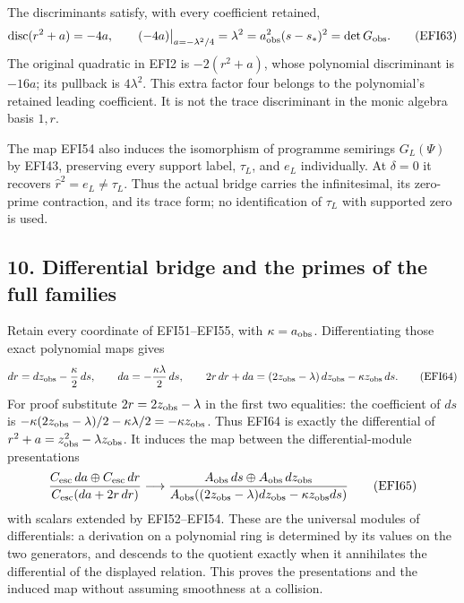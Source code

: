\documentclass[
  10pt,
  a4paper,
]{article}
\begin{document}
The discriminants satisfy, with every coefficient retained, \[
\operatorname{disc}(r^2+a)=-4a,\qquad
(-4a)\big|_{a=-\lambda^2/4}=\lambda^2
=a_{\rm obs}^2(s-s_*)^2
=\det G_{\rm obs}.
\tag{EFI63}
\] The original quadratic in EFI2 is \(-2(r^2+a)\), whose polynomial
discriminant is \(-16a\); its pullback is \(4\lambda^2\). This extra
factor four belongs to the polynomial's retained leading coefficient. It
is not the trace discriminant in the monic algebra basis \(1,r\).

The map EFI54 also induces the isomorphism of programme semirings
\(G_L(\Psi)\) by EFI43, preserving every support label, \(\tau_L\), and
\(e_L\) individually. At \(\delta=0\) it recovers
\(\widehat r^2=e_L\ne\tau_L\). Thus the actual bridge carries the
infinitesimal, its zero-prime contraction, and its trace form; no
identification of \(\tau_L\) with supported zero is used.

\subsection{10. Differential bridge and the primes of the full
families}\label{differential-bridge-and-the-primes-of-the-full-families}

Retain every coordinate of EFI51--EFI55, with \(\kappa=a_{\rm obs}\).
Differentiating those exact polynomial maps gives \[
dr=dz_{\rm obs}-\frac\kappa2\,ds,\qquad
da=-\frac{\kappa\lambda}{2}\,ds,\qquad
2r\,dr+da=(2z_{\rm obs}-\lambda)\,dz_{\rm obs}
-\kappa z_{\rm obs}\,ds.
\tag{EFI64}
\] For proof substitute \(2r=2z_{\rm obs}-\lambda\) in the first two
equalities: the coefficient of \(ds\) is
\(-\kappa(2z_{\rm obs}-\lambda)/2-\kappa\lambda/2
=-\kappa z_{\rm obs}\). Thus EFI64 is exactly the differential of
\(r^2+a=z_{\rm obs}^2-\lambda z_{\rm obs}\). It induces the map between
the differential-module presentations \[
\frac{C_{\rm esc}\,da\oplus C_{\rm esc}\,dr}
     {C_{\rm esc}(da+2r\,dr)}
\longrightarrow
\frac{A_{\rm obs}\,ds\oplus A_{\rm obs}\,dz_{\rm obs}}
     {A_{\rm obs}((2z_{\rm obs}-\lambda)dz_{\rm obs}
                    -\kappa z_{\rm obs}ds)}
\tag{EFI65}
\] with scalars extended by EFI52--EFI54. These are the universal
modules of differentials: a derivation on a polynomial ring is
determined by its values on the two generators, and descends to the
quotient exactly when it annihilates the differential of the displayed
relation. This proves the presentations and the induced map without
assuming smoothness at a collision.
\end{document}
